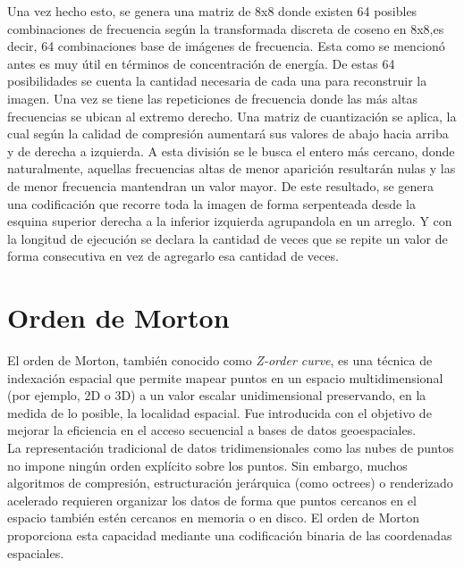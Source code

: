         Una vez hecho esto, se genera una matriz de 8x8 donde existen 64 posibles combinaciones de frecuencia según la transformada discreta de coseno en 8x8,es decir, 64 combinaciones base de imágenes de frecuencia. Esta como se mencionó antes es muy útil en términos de concentración de energía. De estas 64 posibilidades se cuenta la cantidad necesaria de cada una para reconstruir la imagen.
        Una vez se tiene las repeticiones de frecuencia donde las más altas frecuencias se ubican al extremo derecho. Una matriz de cuantización se aplica, la cual según la calidad de compresión aumentará sus valores de abajo hacia arriba y de derecha a izquierda. A esta división se le busca el entero más cercano, donde naturalmente, aquellas frecuencias altas de menor aparición resultarán nulas y las de menor frecuencia mantendran un valor mayor.
        De este resultado, se genera una codificación que recorre toda la imagen de forma serpenteada desde la esquina superior derecha a la inferior izquierda agrupandola en un arreglo. Y con la longitud de ejecución se declara la cantidad de veces que se repite un valor de forma consecutiva en vez de agregarlo esa cantidad de veces.
        

\section{Orden de Morton}\label{sec:morton_order}
    El orden de Morton, también conocido como \textit{Z-order curve}, es una técnica de indexación espacial que permite mapear puntos en un espacio multidimensional (por ejemplo, 2D o 3D) a un valor escalar unidimensional preservando, en la medida de lo posible, la localidad espacial. Fue introducida con el objetivo de mejorar la eficiencia en el acceso secuencial a bases de datos geoespaciales. \cite{morton1966zorder}\\

    La representación tradicional de datos tridimensionales como las nubes de puntos no impone ningún orden explícito sobre los puntos. Sin embargo, muchos algoritmos de compresión, estructuración jerárquica (como octrees) o renderizado acelerado requieren organizar los datos de forma que puntos cercanos en el espacio también estén cercanos en memoria o en disco. El orden de Morton proporciona esta capacidad mediante una codificación binaria de las coordenadas espaciales.
    
